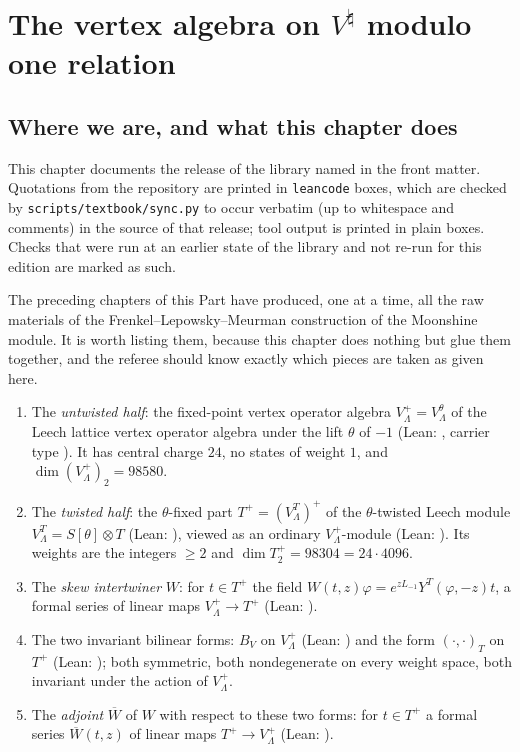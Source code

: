 \chapter{The vertex algebra on \texorpdfstring{$V^\natural$}{V natural} modulo one relation}\label{ch:10}

\providecommand{\chtenWb}{\overline{W}}
\providecommand{\chtenTP}{T^{+}}
\providecommand{\chtenVP}{V_{\Lambda}^{+}}
\providecommand{\chtenB}{B^{\natural}}

\section{Where we are, and what this chapter does}\label{ch10:sec:intro}

This chapter documents the release of the library named in the front matter. Quotations from the
repository are printed in \texttt{leancode} boxes, which are checked by \texttt{scripts/textbook/sync.py} to occur verbatim
(up to whitespace and comments) in the source of that release; tool output is printed in plain boxes. Checks that were run at an earlier state of the library and not re-run for this edition are marked as such.

The preceding chapters of this Part have produced, one at a time, all the raw materials of the
Frenkel--Lepowsky--Meurman construction of the Moonshine module.  It is worth listing them,
because this chapter does nothing but glue them together, and the referee should know exactly
which pieces are taken as given here.

\begin{enumerate}[label=(\roman*)]
\item The \emph{untwisted half}: the fixed-point vertex operator algebra
  $\chtenVP=V_\Lambda^{\theta}$ of the Leech lattice vertex operator algebra under the lift
  $\theta$ of $-1$ (Lean: , carrier type ).  It has central
  charge $24$, no states of weight $1$, and $\dim(\chtenVP)_2=98580$.
\item The \emph{twisted half}: the $\theta$-fixed part $\chtenTP=(V_\Lambda^T)^+$ of the
  $\theta$-twisted Leech module $V_\Lambda^T=S[\theta]\otimes T$ (Lean: ), viewed as an
  ordinary $\chtenVP$-module (Lean: ).  Its weights are the integers $\ge 2$
  and $\dim\chtenTP_2=98304=24\cdot 4096$.
\item The \emph{skew intertwiner} $W$: for $t\in\chtenTP$ the field
  $W(t,z)\varphi=e^{zL_{-1}}Y^T(\varphi,-z)t$, a formal series of linear maps
  $\chtenVP\to\chtenTP$ (Lean: ).
\item The two invariant bilinear forms: $B_V$ on $\chtenVP$ (Lean: ) and the form
  $(\cdot,\cdot)_T$ on $\chtenTP$ (Lean: ); both symmetric, both nondegenerate on
  every weight space, both invariant under the action of $\chtenVP$.
\item The \emph{adjoint} $\chtenWb$ of $W$ with respect to these two forms: for $t\in\chtenTP$ a
  formal series $\chtenWb(t,z)$ of linear maps $\chtenTP\to\chtenVP$ (Lean: ).
\end{enumerate}

